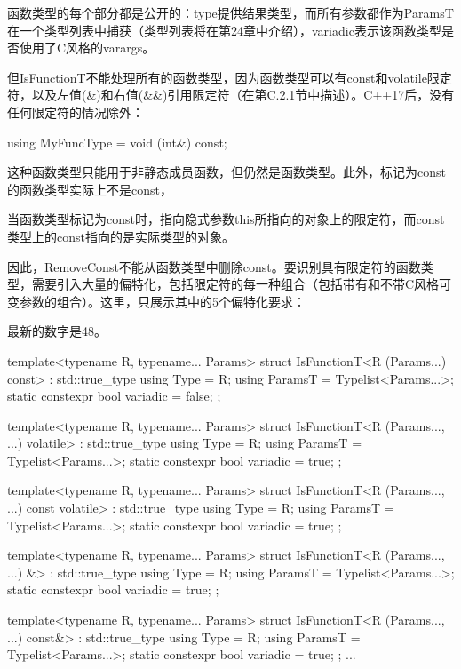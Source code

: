 函数类型的每个部分都是公开的：type提供结果类型，而所有参数都作为ParamsT在一个类型列表中捕获（类型列表将在第24章中介绍），variadic表示该函数类型是否使用了C风格的varargs。

但IsFunctionT不能处理所有的函数类型，因为函数类型可以有const和volatile限定符，以及左值(\&)和右值(\&\&)引用限定符（在第C.2.1节中描述）。C++17后，没有任何限定符的情况除外：

\begin{cpp}
using MyFuncType = void (int&) const;
\end{cpp}

这种函数类型只能用于非静态成员函数，但仍然是函数类型。此外，标记为const的函数类型实际上不是const，

\begin{notice}
当函数类型标记为const时，指向隐式参数this所指向的对象上的限定符，而const类型上的const指向的是实际类型的对象。
\end{notice}

因此，RemoveConst不能从函数类型中删除const。要识别具有限定符的函数类型，需要引入大量的偏特化，包括限定符的每一种组合（包括带有和不带C风格可变参数的组合）。这里，只展示其中的5个偏特化要求：

\begin{notice}
最新的数字是48。
\end{notice}

\begin{cpp}
template<typename R, typename... Params>
struct IsFunctionT<R (Params...) const> : std::true_type {
	using Type = R;
	using ParamsT = Typelist<Params...>;
	static constexpr bool variadic = false;
};

template<typename R, typename... Params>
struct IsFunctionT<R (Params..., ...) volatile> : std::true_type {
	using Type = R;
	using ParamsT = Typelist<Params...>;
	static constexpr bool variadic = true;
};

template<typename R, typename... Params>
struct IsFunctionT<R (Params..., ...) const volatile> : std::true_type {
	using Type = R;
	using ParamsT = Typelist<Params...>;
	static constexpr bool variadic = true;
};

template<typename R, typename... Params>
struct IsFunctionT<R (Params..., ...) &> : std::true_type {
	using Type = R;
	using ParamsT = Typelist<Params...>;
	static constexpr bool variadic = true;
};

template<typename R, typename... Params>
struct IsFunctionT<R (Params..., ...) const&> : std::true_type {
	using Type = R;
	using ParamsT = Typelist<Params...>;
	static constexpr bool variadic = true;
};
...
\end{cpp}

